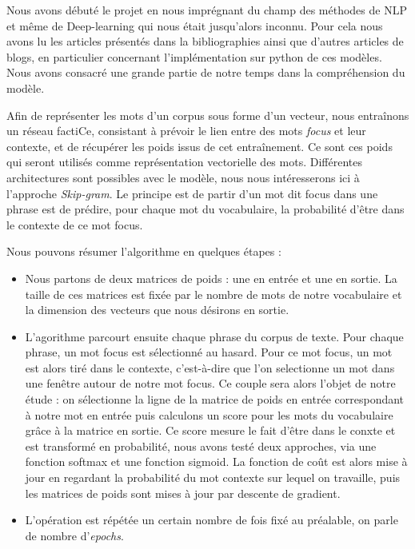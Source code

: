 \documentclass[11pt,french,french]{article}
\begin{document}
Nous avons débuté le projet en nous imprégnant du champ des méthodes de
NLP et même de Deep-learning qui nous était jusqu'alors inconnu. Pour
cela nous avons lu les articles présentés dans la bibliographies ainsi
que d'autres articles de blogs, en particulier concernant
l'implémentation sur python de ces modèles. Nous avons consacré une
grande partie de notre temps dans la compréhension du modèle.

Afin de représenter les mots d'un corpus sous forme d'un vecteur, nous
entraînons un réseau factiCe, consistant à prévoir le lien entre des
mots \emph{focus} et leur contexte, et de récupérer les poids issus de
cet entraînement. Ce sont ces poids qui seront utilisés comme
représentation vectorielle des mots. Différentes architectures sont
possibles avec le modèle, nous nous intéresserons ici à l'approche
\textit{Skip-gram}. Le principe est de partir d'un mot dit focus dans
une phrase est de prédire, pour chaque mot du vocabulaire, la
probabilité d'être dans le contexte de ce mot focus.

Nous pouvons résumer l'algorithme en quelques étapes :

\begin{itemize}
\item Nous partons de deux matrices de poids : une en entrée et une en sortie. La taille de ces matrices est fixée par le nombre de mots de notre vocabulaire et la dimension des vecteurs que nous désirons en sortie. 
\item L'agorithme parcourt ensuite chaque phrase du corpus de texte. Pour chaque phrase, un mot focus est sélectionné au hasard. Pour ce mot focus, un mot est alors tiré dans le contexte, c'est-à-dire que l'on selectionne un mot dans une fenêtre autour de notre mot focus. Ce couple sera alors l'objet de notre étude : on sélectionne la ligne de la matrice de poids en entrée correspondant à notre mot en entrée puis calculons un score pour les mots du vocabulaire grâce à la matrice en sortie. Ce score mesure le fait d'être dans le conxte et est transformé en probabilité, nous avons testé deux approches, via une fonction softmax et une fonction sigmoid. La fonction de coût est alors mise à jour en regardant la probabilité du mot contexte sur lequel on travaille, puis les matrices de poids sont mises à jour par descente de gradient.
\item L'opération est répétée un certain nombre de fois fixé au préalable, on parle de nombre d'\textit{epochs}.
\end{itemize}
\end{document}
